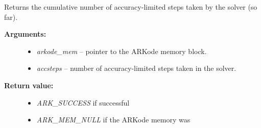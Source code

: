 \documentclass[letterpaper,10pt,english]{sphinxmanual}
\begin{document}

\begin{fulllineitems}
\label{c_interface/User_callable:ARKodeGetNumAccSteps}
Returns the cumulative number of accuracy-limited steps
taken by the solver (so far).
\begin{description}
\item[{\textbf{Arguments:}}] \leavevmode\begin{itemize}
\item {} 
\emph{arkode\_mem} -- pointer to the ARKode memory block.

\item {} 
\emph{accsteps} -- number of accuracy-limited steps taken in the solver.

\end{itemize}

\item[{\textbf{Return value:}}] \leavevmode\begin{itemize}
\item {} 
\emph{ARK\_SUCCESS} if successful

\item {} 
\emph{ARK\_MEM\_NULL} if the ARKode memory was 

\end{itemize}

\end{description}

\end{fulllineitems}

\end{document}
